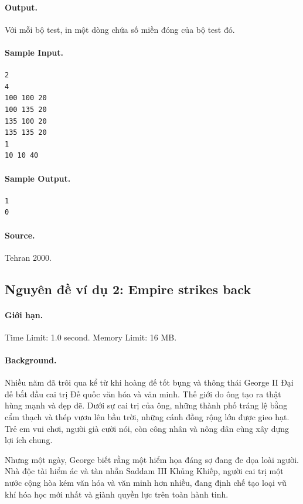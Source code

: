 \documentclass[11pt]{article}
\begin{document}
\paragraph{Output.}
Với mỗi bộ test, in một dòng chứa số miền đóng của bộ test đó.

\paragraph{Sample Input.}
\begin{verbatim}
2
4
100 100 20
100 135 20
135 100 20
135 135 20
1
10 10 40
\end{verbatim}

\paragraph{Sample Output.}
\begin{verbatim}
1
0
\end{verbatim}

\paragraph{Source.}
Tehran 2000.

\subsection{Nguyên đề ví dụ 2: Empire strikes back}

\paragraph{Giới hạn.}
Time Limit: 1.0 second. Memory Limit: 16 MB.

\paragraph{Background.}
Nhiều năm đã trôi qua kể từ khi hoàng đế tốt bụng và thông thái George II Đại
đế bắt đầu cai trị Đế quốc văn hóa và văn minh. Thế giới do ông tạo ra thật
hùng mạnh và đẹp đẽ. Dưới sự cai trị của ông, những thành phố tráng lệ bằng
cẩm thạch và thép vươn lên bầu trời, những cánh đồng rộng lớn được gieo hạt.
Trẻ em vui chơi, người già cười nói, còn công nhân và nông dân cùng xây dựng
lợi ích chung.

Nhưng một ngày, George biết rằng một hiểm họa đáng sợ đang đe dọa loài người.
Nhà độc tài hiểm ác và tàn nhẫn Saddam III Khủng Khiếp, người cai trị một nước
cộng hòa kém văn hóa và văn minh hơn nhiều, đang định chế tạo loại vũ khí hóa
học mới nhất và giành quyền lực trên toàn hành tinh.
\end{document}
